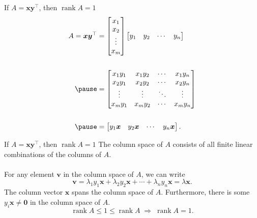\documentclass[handout]{beamer}
\def\x{\bm{x}}
\def\y{\bm{y}}
\def\v{\bm{v}}
\def\xcol{\begin{bmatrix} x_1 \\ x_2 \\ \vdots \\ x_m \end{bmatrix} }
\def\yrow{\begin{bmatrix} y_1 & y_2 & \cdots & y_n \end{bmatrix} }
\def\rank{\operatorname{rank}}
\begin{document}
        \begin{frame}{If $A = \x\y^\top$, then $\rank{A} = 1$}
                \begin{align*}
                        A = \x\y^\top &= \xcol\yrow \\ \\ \pause
                                &= \begin{bmatrix}
                                        x_1y_1 & x_1y_2 & \cdots & x_1y_n \\
                                        x_2y_1 & x_2y_2 & \cdots & x_2y_n \\
                                        \vdots & \vdots & \ddots & \vdots \\
                                        x_my_1 & x_my_2 & \cdots & x_my_n \\
                                \end{bmatrix} \\ \\ \pause
                                &= \begin{bmatrix}
                                        y_1\x & y_2\x & \cdots & y_n\x
                                \end{bmatrix}.
                \end{align*}        
        \end{frame}
        
        \begin{frame}{If $A = \x\y^\top$, then $\rank{A} = 1$}
        The column space of $A$ consists of all finite linear combinations of the columns of $A$. \\~\\
        \pause
        For any element $\v$ in the column space of $A$, we can write
        \[
                \v = \lambda_1y_1\x + \lambda_2y_2\x + \cdots + \lambda_ny_n\x = \lambda \x.
        \]
        \pause
        The column vector $\x$ spans the column space of $A$. 
        Furthermore, there is some $y_i\x\neq\mathbf{0}$ in the column space of $A$. 
        \[
                \rank{A} \leq 1 \leq \rank{A} \;\Rightarrow\; \rank{A} = 1.
        \]
        \end{frame}
        
\end{document}
